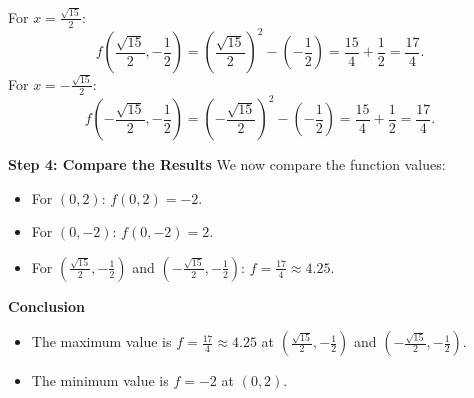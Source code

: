 For $x = \frac{\sqrt{15}}{2}$:
\[
f\left(\frac{\sqrt{15}}{2}, -\frac{1}{2}\right) = \left(\frac{\sqrt{15}}{2}\right)^2 - \left(-\frac{1}{2}\right) = \frac{15}{4} + \frac{1}{2} = \frac{17}{4}.
\]
For $x = -\frac{\sqrt{15}}{2}$:
\[
f\left(-\frac{\sqrt{15}}{2}, -\frac{1}{2}\right) = \left(-\frac{\sqrt{15}}{2}\right)^2 - \left(-\frac{1}{2}\right) = \frac{15}{4} + \frac{1}{2} = \frac{17}{4}.
\]

{\bf Step 4: Compare the Results}
We now compare the function values:
\begin{itemize}
    \item For $(0, 2)$: $f(0, 2) = -2$.
    \item For $(0, -2)$: $f(0, -2) = 2$.
    \item For $\left(\frac{\sqrt{15}}{2}, -\frac{1}{2}\right)$ and $\left(-\frac{\sqrt{15}}{2}, -\frac{1}{2}\right)$: $f = \frac{17}{4} \approx 4.25$.
\end{itemize}

{\bf Conclusion}
\begin{itemize}
    \item The maximum value is $f = \frac{17}{4} \approx 4.25$ at $\left(\frac{\sqrt{15}}{2}, -\frac{1}{2}\right)$ and $\left(-\frac{\sqrt{15}}{2}, -\frac{1}{2}\right)$.
    \item The minimum value is $f = -2$ at $(0, 2)$.
\end{itemize}
